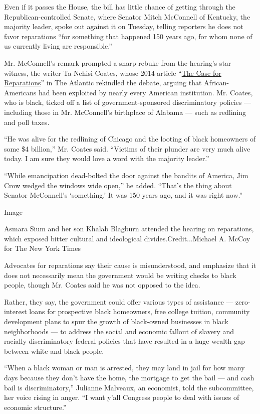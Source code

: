 Even if it passes the House, the bill has little chance of getting
through the Republican-controlled Senate, where Senator Mitch McConnell
of Kentucky, the majority leader, spoke out against it on Tuesday,
telling reporters he does not favor reparations ``for something that
happened 150 years ago, for whom none of us currently living are
responsible.''

Mr. McConnell's remark prompted a sharp rebuke from the hearing's star
witness, the writer Ta-Nehisi Coates, whose 2014 article
``\href{https://www.theatlantic.com/magazine/archive/2014/06/the-case-for-reparations/361631/}{The
Case for Reparations}'' in The Atlantic rekindled the debate, arguing
that African-Americans had been exploited by nearly every American
institution. Mr. Coates, who is black, ticked off a list of
government-sponsored discriminatory policies --- including those in Mr.
McConnell's birthplace of Alabama --- such as redlining and poll taxes.

``He was alive for the redlining of Chicago and the looting of black
homeowners of some \$4 billion,'' Mr. Coates said. ``Victims of their
plunder are very much alive today. I am sure they would love a word with
the majority leader.''

``While emancipation dead-bolted the door against the bandits of
America, Jim Crow wedged the windows wide open,'' he added. ``That's the
thing about Senator McConnell's `something.' It was 150 years ago, and
it was right now.''

Image

Asmara Sium and her son Khalab Blagburn attended the hearing on
reparations, which exposed bitter cultural and ideological
divides.Credit...Michael A. McCoy for The New York Times

Advocates for reparations say their cause is misunderstood, and
emphasize that it does not necessarily mean the government would be
writing checks to black people, though Mr. Coates said he was not
opposed to the idea.

Rather, they say, the government could offer various types of assistance
--- zero-interest loans for prospective black homeowners, free college
tuition, community development plans to spur the growth of black-owned
businesses in black neighborhoods --- to address the social and economic
fallout of slavery and racially discriminatory federal policies that
have resulted in a huge wealth gap between white and black people.

``When a black woman or man is arrested, they may land in jail for how
many days because they don't have the home, the mortgage to get the bail
--- and cash bail is discriminatory,'' Julianne Malveaux, an economist,
told the subcommittee, her voice rising in anger. ``I want y'all
Congress people to deal with issues of economic structure.''

